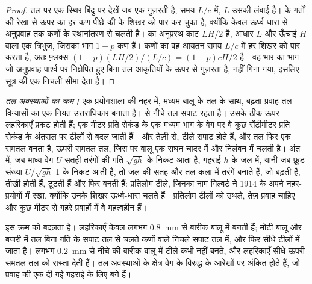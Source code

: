 \begin{proof}
तल पर एक स्थिर बिंदु पर देखें जब एक  गुज़रती है, समय $L/c$ में, $L$ उसकी लंबाई है।  के गर्तों की रेखा से ऊपर का हर कण पीछे की  के शिखर को पार कर चुका है, क्योंकि  केवल ऊर्ध्व-धारा से अनुप्रवाह तक कणों के स्थानांतरण से चलती है।  का अनुप्रस्थ काट $LH/2$ है, आधार $L$ और ऊँचाई $H$ वाला एक त्रिभुज, जिसका भाग $1 - p$ कण हैं। कणों का वह आयतन समय $L/c$ में हर शिखर को पार करता है, अतः फ़्लक्स $(1-p)(LH/2)/(L/c) = (1-p)cH/2$ है। वह भार का भाग जो अनुप्रवाह पार्श्व पर निक्षेपित हुए बिना तल-आकृतियों के ऊपर से गुज़रता है, नहीं गिना गया, इसलिए सूत्र  की एक निचली सीमा देता है।
\end{proof}

\emph{तल-अवस्थाओं का क्रम।} एक प्रयोगशाला की नहर में, मध्यम बालू के तल के साथ, बढ़ता प्रवाह तल-विन्यासों का एक नियत उत्तराधिकार बनाता है।  से नीचे तल सपाट रहता है। उसके ठीक ऊपर लहरिकाएँ प्रकट होती हैं; एक मीटर प्रति सेकंड के एक मध्यम भाग के वेग पर वे कुछ सेंटीमीटर प्रति सेकंड के अंतराल पर टीलों से बदल जाती हैं। और तेज़ी से, टीले सपाट होते हैं, और तल फिर एक समतल बनता है, ऊपरी समतल तल, जिस पर बालू एक सघन चादर में और निलंबन में चलती है। अंत में, जब माध्य वेग $U$ सतही तरंगों की गति $\sqrt{gh}$ के निकट आता है, गहराई $h$ के जल में, यानी जब फ़्रूड संख्या $U/\sqrt{gh}$ 1 के निकट आती है, तो जल की सतह और तल कला में तरंगें बनाते हैं, जो बढ़ती हैं, तीखी होती हैं, टूटती हैं और फिर बनती हैं: प्रतिलोम टीले, जिनका नाम गिल्बर्ट ने 1914 के अपने नहर-प्रयोगों में रखा, क्योंकि उनके शिखर ऊर्ध्व-धारा चलते हैं। प्रतिलोम टीलों को उथले, तेज़ प्रवाह चाहिए और कुछ मीटर से गहरे प्रवाहों में वे महत्वहीन हैं।

 इस क्रम को बदलता है। लहरिकाएँ केवल लगभग \qty{0.8}{mm} से बारीक बालू में बनती हैं; मोटी बालू और बजरी में तल बिना गति के सपाट तल से चलते कणों वाले निचले सपाट तल में, और फिर सीधे टीलों में जाता है। लगभग \qty{0.2}{mm} से नीचे की बारीक बालू में टीले कभी नहीं बनते, और लहरिकाएँ सीधे ऊपरी समतल तल को रास्ता देती हैं। तल-अवस्थाओं के क्षेत्र वेग के विरुद्ध  के आरेखों पर अंकित होते हैं, जो प्रवाह की एक दी गई गहराई के लिए बने हैं।


